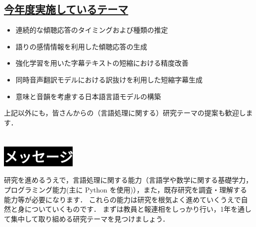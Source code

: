 \documentclass[10.5pt,onecolumn]{jsarticle}
\newcommand{\dg}{\gt}
\begin{document}
    \vspace{-3mm}
    \subsection*{\underline{今年度実施しているテーマ}}

      \begin{itemize}
        \item {\dg 連続的な傾聴応答のタイミングおよび種類の推定}
        \item {\dg 語りの感情情報を利用した傾聴応答の生成}
        \item {\dg 強化学習を用いた字幕テキストの短縮における精度改善}
        \item {\dg 同時音声翻訳モデルにおける訳抜けを利用した短縮字幕生成}
        \item {\dg 意味と音韻を考慮する日本語言語モデルの構築}
      \end{itemize}

    上記以外にも，皆さんからの（言語処理に関する）研究テーマの提案も歓迎します．


  \vspace{-1mm}
  \section*{\colorbox{black}{\textcolor{white}{{\LARGE メッセージ}}}}

  研究を進めるうえで，言語処理に関する能力（言語学や数学に関する基礎学力，プログラミング能力(主に Python を使用)），また，既存研究を調査・理解する能力等が必要になります．
  これらの能力は研究を根気よく進めていくうえで自然と身についていくものです．
  まずは教員と報連相をしっかり行い，1年を通して集中して取り組める研究テーマを見つけましょう．
\end{document}
